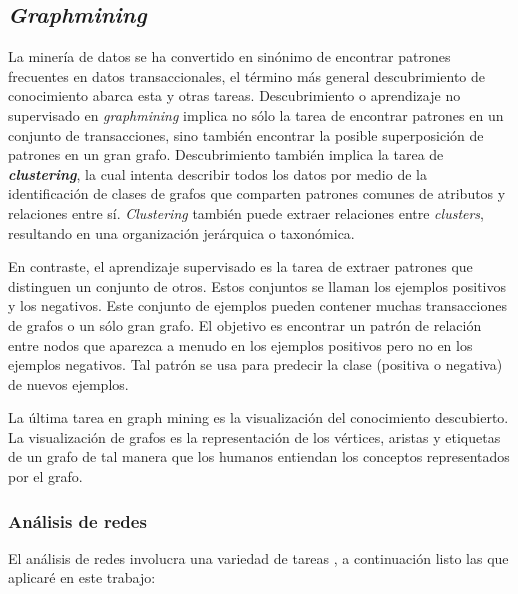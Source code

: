 \subsection{\textit{Graphmining}}
La minería de datos se ha convertido en sinónimo de encontrar patrones frecuentes en datos transaccionales, el término más general descubrimiento de conocimiento abarca esta y otras tareas. Descubrimiento o aprendizaje no supervisado en \textit{graphmining} implica no sólo la tarea de encontrar patrones en un conjunto de transacciones, sino también encontrar la posible superposición de patrones en un gran grafo. Descubrimiento también implica la tarea de \textbf{\textit{clustering}}, la cual intenta describir todos los datos por medio de la identificación de clases de grafos que comparten patrones comunes de atributos y relaciones entre sí. \textit{Clustering} también puede extraer relaciones entre \textit{clusters}, resultando en una organización jerárquica o taxonómica.\cite{Cook2006}
 
En contraste, el aprendizaje supervisado es la tarea de extraer patrones que distinguen un conjunto de otros. Estos conjuntos se llaman los ejemplos positivos y los negativos. Este conjunto de ejemplos pueden contener muchas transacciones de grafos o un sólo gran grafo. El objetivo es encontrar un patrón de relación entre nodos que aparezca a menudo en los ejemplos positivos pero no en los ejemplos negativos. Tal patrón se usa para predecir la clase (positiva o negativa) de nuevos ejemplos. \cite{Cook2006}
 
La última tarea en graph mining es la visualización del conocimiento descubierto. La visualización de grafos es la representación de los vértices, aristas y etiquetas de un grafo de tal manera que los humanos entiendan los conceptos representados por el grafo.\cite{Cook2006}

\subsubsection{Análisis de redes}
El análisis de redes involucra una variedad de tareas \cite{Tang2010}, a continuación listo las que aplicaré en este trabajo:

